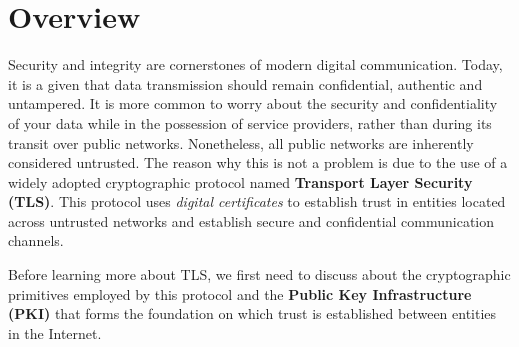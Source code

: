 \section{Overview}

Security and integrity are cornerstones of modern digital communication. Today,
it is a given that data transmission should remain confidential, authentic and
untampered. It is more common to worry about the security and confidentiality
of your data while in the possession of service providers, rather than during
its transit over public networks. Nonetheless, all public networks are
inherently considered untrusted. The reason why this is not a problem is due to
the use of a widely adopted cryptographic protocol named \textbf{Transport
Layer Security (TLS)}. This protocol uses \textit{digital certificates} to
establish trust in entities located across untrusted networks and establish
secure and confidential communication channels.

Before learning more about TLS, we first need to discuss about the cryptographic
primitives employed by this protocol and the \textbf{Public Key Infrastructure
(PKI)} that forms the foundation on which trust is established between entities
in the Internet.

